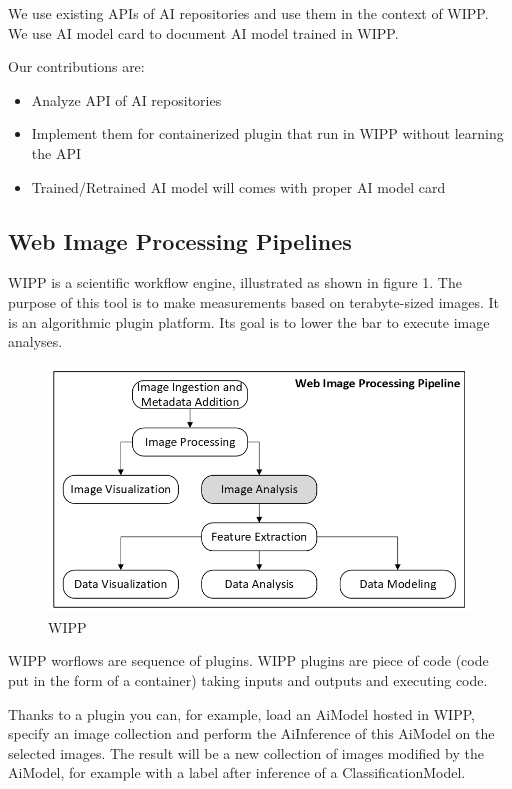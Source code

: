 We use existing APIs of AI repositories and use them in the context of WIPP. We
use AI model card to document AI model trained in WIPP.

Our contributions are:
\begin{itemize}
  \item Analyze API of AI repositories
  \item Implement them for containerized plugin that run in WIPP without learning the API
  \item Trained/Retrained AI model will comes with proper AI model card
\end{itemize}

\subsection{Web Image Processing Pipelines}

WIPP is a scientific workflow engine, illustrated as shown in figure 1.
The purpose of this tool is to make measurements based on terabyte-sized images.
It is an algorithmic plugin platform. Its goal is to lower the bar to execute
image analyses.

\begin{figure}[H]
  \centering
  \includegraphics[width=1.0\linewidth]{png/1_wipp.png}
  \caption{\Gls{WIPP}}
  \label{fig:1wipp}
\end{figure}

WIPP worflows are sequence of plugins. WIPP plugins are piece of code (code put
in the form of a container) taking inputs and outputs and executing code.

Thanks to a plugin you can, for example, load an \Gls{AiModel} hosted in
\Gls{WIPP}, specify an
image collection and perform the \Gls{AiInference} of this \Gls{AiModel} on the
selected images.
The result will be a new collection of images modified by the \Gls{AiModel}, for
example
with a label after inference of a \Gls{ClassificationModel}.

